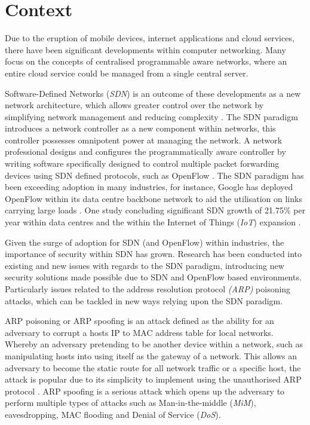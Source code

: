 \documentclass[12pt, oneside]{book}
\begin{document}
\section{Context}
Due to the eruption of mobile devices, internet applications and cloud services, there have been significant
developments within computer networking. Many focus on the concepts of centralised programmable aware networks,
where an entire cloud service could be managed from a single central server.

Software-Defined Networks (\emph{SDN}) is an outcome of these developments as a new network architecture, which allows greater
control over the network by simplifying network management and reducing complexity \cite{feamster2013road}. The SDN
paradigm introduces a network controller as a new component within networks, this controller possesses omnipotent power
at managing the network. A network professional designs and configures the programmatically aware controller
by writing software specifically designed to control multiple packet forwarding devices using SDN defined protocols,
such as OpenFlow \cite{lara2013network}. The SDN paradigm has been exceeding adoption in many industries, for instance,
Google has deployed OpenFlow within its data centre backbone network to aid the utilisation on links carrying large
loads \cite{higginbotham2012}.
One study concluding significant SDN growth of 21.75\% per year within data centres and the
within the Internet of Things (\emph{IoT}) expansion \cite{tayyaba2016software}\cite{drutskoy2012scalable}. \newline

Given the surge of adoption for SDN (and OpenFlow) within industries, the importance of security within SDN
has grown. Research has been conducted into existing and new issues with regards to the SDN paradigm, introducing
new security solutions made
possible due to SDN and OpenFlow based environments. Particularly issues related to the
address resolution protocol \emph{(ARP)} poisoning attacks, which can be tackled in new ways relying upon the SDN paradigm.

ARP poisoning or ARP spoofing is an attack defined as the ability for an adversary to corrupt a hosts
IP to MAC address table for local networks. Whereby an adversary
pretending to be another device within
a network, such as manipulating hosts into using itself as the gateway of a
network. This allows an adversary to become the static route for all network traffic or a specific host, the attack 
is popular due to its simplicity to implement using the unauthorised ARP protocol \cite{nam2010enhanced}. ARP
spoofing is a serious attack which opens up the adversary to perform multiple types of attacks such as
Man-in-the-middle (\emph{MiM}), eavesdropping, MAC flooding and Denial of Service (\emph{DoS}).
\end{document}
